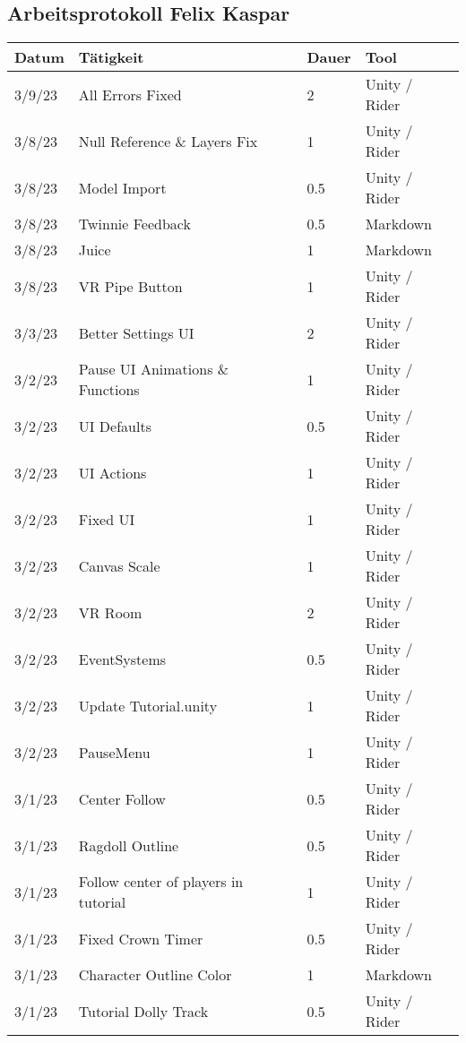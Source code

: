 \subsection{Arbeitsprotokoll Felix Kaspar}

\begin{longtable}{|p{1.5cm}|p{6cm}|p{1.2cm}|p{2.7cm}|}
	\hline
	\textbf{Datum} & \textbf{Tätigkeit} & \textbf{Dauer} & \textbf{Tool} \\ \hline
	\endhead
	3/9/23 & All Errors Fixed & 2 & Unity / Rider \\ \hline
	3/8/23 & Null Reference \& Layers Fix & 1 & Unity / Rider \\ \hline
	3/8/23 & Model Import & 0.5 & Unity / Rider \\ \hline
	3/8/23 & Twinnie Feedback & 0.5 & Markdown \\ \hline
	3/8/23 & Juice & 1 & Markdown \\ \hline
	3/8/23 & VR Pipe Button & 1 & Unity / Rider \\ \hline
	3/3/23 & Better Settings UI & 2 & Unity / Rider \\ \hline
	3/2/23 & Pause UI Animations \& Functions & 1 & Unity / Rider \\ \hline
	3/2/23 & UI Defaults & 0.5 & Unity / Rider \\ \hline
	3/2/23 & UI Actions & 1 & Unity / Rider \\ \hline
	3/2/23 & Fixed UI & 1 & Unity / Rider \\ \hline
	3/2/23 & Canvas Scale & 1 & Unity / Rider \\ \hline
	3/2/23 & VR Room & 2 & Unity / Rider \\ \hline
	3/2/23 & EventSystems & 0.5 & Unity / Rider \\ \hline
	3/2/23 & Update Tutorial.unity & 1 & Unity / Rider \\ \hline
	3/2/23 & PauseMenu & 1 & Unity / Rider \\ \hline
	3/1/23 & Center Follow & 0.5 & Unity / Rider \\ \hline
	3/1/23 & Ragdoll Outline & 0.5 & Unity / Rider \\ \hline
	3/1/23 & Follow center of players in tutorial & 1 & Unity / Rider \\ \hline
	3/1/23 & Fixed Crown Timer & 0.5 & Unity / Rider \\ \hline
	3/1/23 & Character Outline Color & 1 & Markdown \\ \hline
	3/1/23 & Tutorial Dolly Track & 0.5 & Unity / Rider \\ \hline

\end{longtable}
